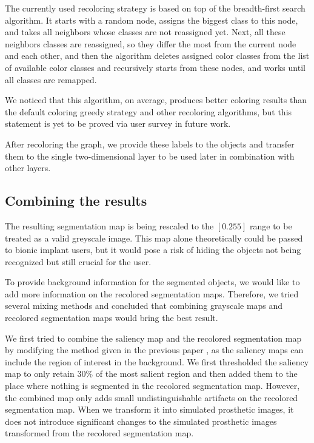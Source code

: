 The currently used recoloring strategy is based on top of the breadth-first search algorithm. It starts with a random node, assigns the biggest class to this node, and takes all neighbors whose classes are not reassigned yet. Next, all these neighbors classes are reassigned, so they differ the most from the current node and each other, and then the algorithm deletes assigned color classes from the list of available color classes and recursively starts from these nodes, and works until all classes are remapped.

We noticed that this algorithm, on average, produces better coloring results than the default coloring greedy strategy and other recoloring algorithms, but this statement is yet to be proved via user survey in future work.

After recoloring the graph, we provide these labels to the objects and transfer them to the single two-dimensional layer to be used later in combination with other layers.

\subsection{Combining the results}
\label{methods:combining}

The resulting segmentation map is being rescaled to the $[0.255]$ range to be treated as a valid greyscale image. This map alone theoretically could be passed to bionic implant users, but it would pose a risk of hiding the objects not being recognized but still crucial for the user.

To provide background information for the segmented objects, we would like to add more information on the recolored segmentation maps. Therefore, we tried several mixing methods and concluded that combining grayscale maps and recolored segmentation maps would bring the best result.

We first tried to combine the saliency map and the recolored segmentation map by modifying the method given in the previous paper \cite{han2021deep}, as the saliency maps can include the region of interest in the background. We first thresholded the saliency map to only retain 30\% of the most salient region and then added them to the place where nothing is segmented in the recolored segmentation map. However, the combined map only adds small undistinguishable artifacts on the recolored segmentation map. When we transform it into simulated prosthetic images, it does not introduce significant changes to the simulated prosthetic images transformed from the recolored segmentation map.

